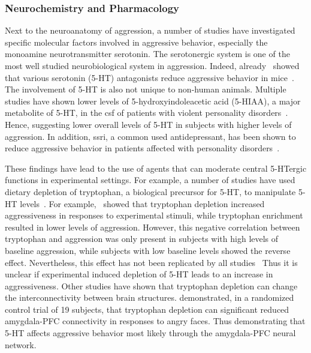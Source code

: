 \subsubsection{Neurochemistry and Pharmacology}
\label{ssub:neurochemistry_and_pharmacology}

Next to the neuroanatomy of aggression, a number of studies have investigated specific molecular factors involved in aggressive behavior, especially the monoamine neurotransmitter serotonin.
The serotonergic system is one of the most well studied neurobiological system in aggression.
Indeed, already~\citet{Malick1976} showed that various serotonin (5-HT) antagonists reduce aggressive behavior in mice~\cite{Malick1976}.
The involvement of 5-HT is also not unique to non-human animals.
Multiple studies have shown lower levels of 5-hydroxyindoleacetic acid (5-HIAA), a major metabolite of 5-HT, in the \acrfull{csf} of patients with violent personality disorders~\cite{Brown1982,Brown1979}.
Hence, suggesting lower overall levels of 5-HT in subjects with higher levels of aggression.
In addition, \acrfull{ssri}, a common used antidepressant, has been shown to reduce aggressive behavior in patients affected with personality disorders~\cite{Zanarini2004,Coccaro1997a}. 

These findings have lead to the use of agents that can moderate central 5-HTergic functions in experimental settings.
For example, a number of studies have used dietary depletion of tryptophan, a biological precursor for 5-HT, to manipulate 5-HT levels~\cite{Williams1999,Carpenter1998}.
For example,~\citet{Bjork2000} showed that tryptophan depletion increased aggressiveness in responses to experimental stimuli, while tryptophan enrichment resulted in lower levels of aggression.
However, this negative correlation between tryptophan and aggression was only present in subjects with high levels of baseline aggression, while subjects with low baseline levels showed the reverse effect.
Nevertheless, this effect has not been replicated by all studies~\cite{Stadler2008,Kotting2013,Kramer2011}
Thus it is unclear if experimental induced depletion of 5-HT leads to an increase in aggressiveness.
Other studies have shown that tryptophan depletion can change the interconnectivity between brain structures.
\citet{Passamonti2012} demonstrated, in a randomized control trial of 19 subjects, that tryptophan depletion can significant reduced amygdala-PFC connectivity in responses to angry faces.
Thus demonstrating that 5-HT affects aggressive behavior most likely through the amygdala-PFC neural network.

